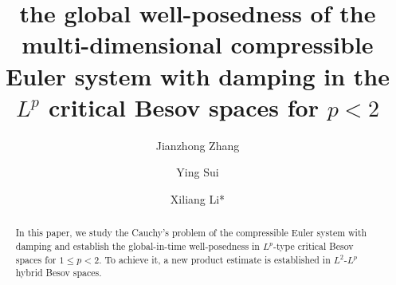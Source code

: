 \documentclass{amsart}
\theoremstyle{definition}
\theoremstyle{remark}
\numberwithin{equation}{section}
\begin{document}
\pagestyle{fancy}
\fancyhf{}
\renewcommand{\footrulewidth}{0mm}
\renewcommand{\headrulewidth}{0mm}
\fancyhead[LE]{\thepage}
\fancyhead[RO]{\thepage}

\title{the global well-posedness of the multi-dimensional compressible Euler system with damping in the $L^p$ critical Besov spaces for $p<2$}

\author{Jianzhong Zhang}

\address{School of Mathematics and Information Science, Shandong Technology and Business University, Yantai, Shandong, 264005,P. R. China}


\author{Ying Sui}

\address{School of Mathematics and Information Science, Shandong Technology and Business University, Yantai, Shandong, 264005,P. R. China}

\author{Xiliang Li*}
\address{School of Mathematics and Information Science, Shandong Technology and Business University, Yantai, Shandong, 264005,P. R. China}





\begin{abstract}
In this paper, we study the Cauchy's problem of the compressible Euler system with damping and establish the global-in-time well-posedness in $L^p$-type critical Besov spaces for $1\leq p<2$. To achieve it, a new product estimate is established in $L^2$-$L^p$ hybrid Besov spaces.
\end{abstract}

\maketitle


\end{document}

